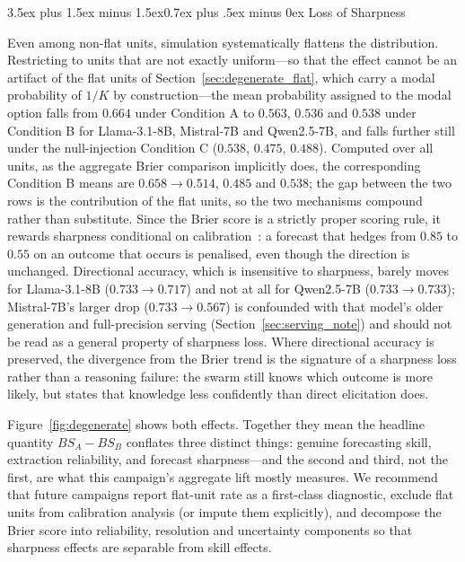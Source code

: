 \documentclass[11pt,journal,onecolumn]{IEEEtran}
\makeatletter
\renewcommand\subsection{\@startsection{subsection}{2}{\z@}%
  {3.5ex plus 1.5ex minus 1.5ex}{0.7ex plus .5ex minus 0ex}%
  {\normalfont\normalsize\bfseries}}
\makeatother
\begin{document}
\subsection{Loss of Sharpness}
\label{sec:degenerate_sharpness}

Even among non-flat units, simulation systematically flattens the distribution. Restricting to units that are not exactly uniform---so that the effect cannot be an artifact of the flat units of Section~\ref{sec:degenerate_flat}, which carry a modal probability of $1/K$ by construction---the mean probability assigned to the modal option falls from $0.664$ under Condition A to $0.563$, $0.536$ and $0.538$ under Condition B for Llama-3.1-8B, Mistral-7B and Qwen2.5-7B, and falls further still under the null-injection Condition C ($0.538$, $0.475$, $0.488$). Computed over all units, as the aggregate Brier comparison implicitly does, the corresponding Condition B means are $0.658 \to 0.514$, $0.485$ and $0.538$; the gap between the two rows is the contribution of the flat units, so the two mechanisms compound rather than substitute. Since the Brier score is a strictly proper scoring rule, it rewards sharpness conditional on calibration~\cite{gneiting2007}: a forecast that hedges from $0.85$ to $0.55$ on an outcome that occurs is penalised, even though the direction is unchanged. Directional accuracy, which is insensitive to sharpness, barely moves for Llama-3.1-8B ($0.733 \to 0.717$) and not at all for Qwen2.5-7B ($0.733 \to 0.733$); Mistral-7B's larger drop ($0.733 \to 0.567$) is confounded with that model's older generation and full-precision serving (Section~\ref{sec:serving_note}) and should not be read as a general property of sharpness loss. Where directional accuracy is preserved, the divergence from the Brier trend is the signature of a sharpness loss rather than a reasoning failure: the swarm still knows which outcome is more likely, but states that knowledge less confidently than direct elicitation does.

Figure~\ref{fig:degenerate} shows both effects. Together they mean the headline quantity $BS_A - BS_B$ conflates three distinct things: genuine forecasting skill, extraction reliability, and forecast sharpness---and the second and third, not the first, are what this campaign's aggregate lift mostly measures. We recommend that future campaigns report flat-unit rate as a first-class diagnostic, exclude flat units from calibration analysis (or impute them explicitly), and decompose the Brier score into reliability, resolution and uncertainty components so that sharpness effects are separable from skill effects.
\end{document}
